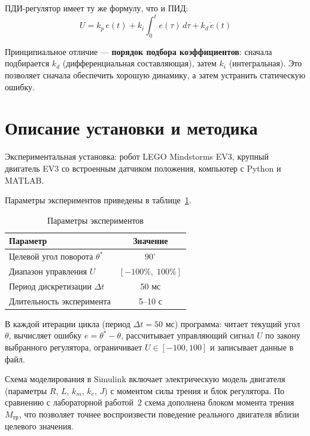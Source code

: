 \documentclass[a4paper, 12pt]{article}
\begin{document}
ПДИ-регулятор имеет ту же формулу, что и ПИД:
\begin{equation}
U = k_p\, e(t) + k_i \int_0^t e(\tau)\,d\tau + k_d\, \dot{e}(t)
\end{equation}

Принципиальное отличие --- \textbf{порядок подбора коэффициентов}: сначала подбирается
$k_d$ (дифференциальная составляющая), затем $k_i$ (интегральная). Это позволяет сначала
обеспечить хорошую динамику, а затем устранить статическую ошибку.

\newpage
\section{Описание установки и методика}

Экспериментальная установка: робот LEGO Mindstorms EV3, крупный двигатель EV3
со встроенным датчиком положения, компьютер с Python и MATLAB.

Параметры экспериментов приведены в таблице~\ref{tab:exp_params}.

\begin{table}[H]
\centering
\begin{tabular}{|l|c|}
\hline
\textbf{Параметр} & \textbf{Значение} \\
\hline
Целевой угол поворота $\theta^*$ & $90^\circ$ \\
\hline
Диапазон управления $U$ & $[-100\%,\; 100\%]$ \\
\hline
Период дискретизации $\Delta t$ & 50 мс \\
\hline
Длительность эксперимента & 5--10 с \\
\hline
\end{tabular}
\caption{Параметры экспериментов}
\label{tab:exp_params}
\end{table}

В каждой итерации цикла (период $\Delta t = 50$ мс) программа:
читает текущий угол $\theta$, вычисляет ошибку $e = \theta^* - \theta$,
рассчитывает управляющий сигнал $U$ по закону выбранного регулятора,
ограничивает $U \in [-100, 100]$ и записывает данные в файл.

Схема моделирования в Simulink включает электрическую модель двигателя
(параметры $R$, $L$, $k_m$, $k_e$, $J$) с моментом силы трения и блок регулятора.
По сравнению с лабораторной работой~2 схема дополнена блоком момента трения $M_{\text{тр}}$,
что позволяет точнее воспроизвести поведение реального двигателя вблизи целевого значения.
\end{document}
